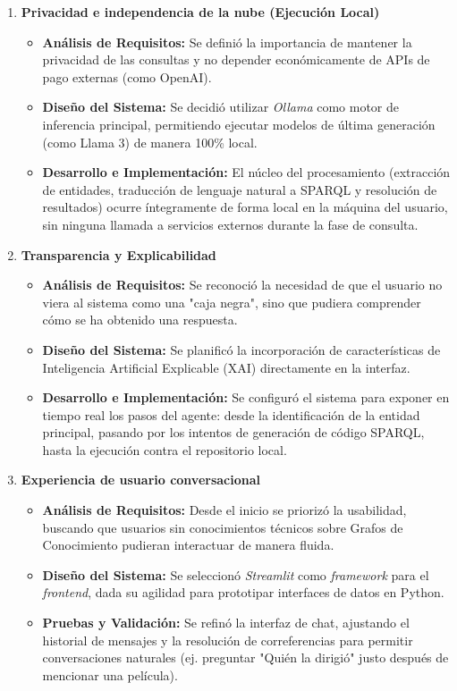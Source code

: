 \begin{enumerate}
    \item \textbf{Privacidad e independencia de la nube (Ejecución Local)}
    \begin{itemize}
        \item \textbf{Análisis de Requisitos:} Se definió la importancia de mantener la privacidad de las consultas y no depender económicamente de APIs de pago externas (como OpenAI).
        \item \textbf{Diseño del Sistema:} Se decidió utilizar \textit{Ollama} como motor de inferencia principal, permitiendo ejecutar modelos de última generación (como Llama 3) de manera 100\% local.
        \item \textbf{Desarrollo e Implementación:} El núcleo del procesamiento (extracción de entidades, traducción de lenguaje natural a SPARQL y resolución de resultados) ocurre íntegramente de forma local en la máquina del usuario, sin ninguna llamada a servicios externos durante la fase de consulta.
    \end{itemize}

    \item \textbf{Transparencia y Explicabilidad}
    \begin{itemize}
        \item \textbf{Análisis de Requisitos:} Se reconoció la necesidad de que el usuario no viera al sistema como una "caja negra", sino que pudiera comprender cómo se ha obtenido una respuesta.
        \item \textbf{Diseño del Sistema:} Se planificó la incorporación de características de Inteligencia Artificial Explicable (XAI) directamente en la interfaz.
        \item \textbf{Desarrollo e Implementación:} Se configuró el sistema para exponer en tiempo real los pasos del agente: desde la identificación de la entidad principal, pasando por los intentos de generación de código SPARQL, hasta la ejecución contra el repositorio local.
    \end{itemize}

    \item \textbf{Experiencia de usuario conversacional}
    \begin{itemize}
        \item \textbf{Análisis de Requisitos:} Desde el inicio se priorizó la usabilidad, buscando que usuarios sin conocimientos técnicos sobre Grafos de Conocimiento pudieran interactuar de manera fluida.
        \item \textbf{Diseño del Sistema:} Se seleccionó \textit{Streamlit} como \textit{framework} para el \textit{frontend}, dada su agilidad para prototipar interfaces de datos en Python.
        \item \textbf{Pruebas y Validación:} Se refinó la interfaz de chat, ajustando el historial de mensajes y la resolución de correferencias para permitir conversaciones naturales (ej. preguntar "Quién la dirigió" justo después de mencionar una película).
    \end{itemize}


\end{enumerate}
